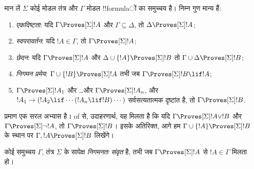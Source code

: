 \documentclass[../../../include/open-logic-section]{subfiles}
\begin{document}


\begin{prop}
  मान लें $\Sigma$ कोई मोडल तंत्र और $\Gamma$ मोडल !!{formula}ों का समुच्चय
  है। निम्न गुण मान्य हैं:
  \begin{enumerate}
  \item{} \emph{एकदिष्टता}: यदि
    $\Gamma \Proves[\Sigma] !A$ और $\Gamma \subseteq \Delta$, तो
    $\Delta \Proves[\Sigma] !A$;
  \item{}
    \emph{स्वपरावर्तन}: यदि $!A \in \Gamma$, तो $\Gamma
    \Proves[\Sigma] !A$;
  \item{} \emph{छेदन}: यदि $\Gamma
    \Proves[\Sigma] !A$ और $\Delta \cup \{!A\} \Proves[\Sigma] !B$
    तो $\Gamma \cup \Delta \Proves[\Sigma] !B$;
  \item{} \emph{निगमन प्रमेय}:
    $\Gamma \cup \{!B\} \Proves[\Sigma] !A$ तभी जब
    $\Gamma \Proves[\Sigma] !B \lif
      !A$;
  \item {}%
    $\Gamma \Proves[\Sigma] !A_1$ और \dots और
    $\Gamma \Proves[\Sigma] !A_n$, और
    $!A_1 \to (!A_2 \lif \cdots (!A_n \lif !B)\cdots)$ सर्वसत्यतात्मक
    दृष्टांत है, तो $\Gamma
    \Proves[\Sigma] !B$.
  \end{enumerate}
\end{prop}

प्रमाण एक सरल अभ्यास है।
 of 
से, उदाहरणार्थ, यह मिलता है कि यदि $\Gamma \Proves[\Sigma] !A \lor !B$
और $\Gamma \Proves[\Sigma] \lnot !A$, तो $\Gamma \Proves[\Sigma] !B$।
इसके अतिरिक्त, आगे हम $\Gamma \cup \{!A\} \Proves[\Sigma] !B$ के स्थान पर
$\Gamma, !A \Proves[\Sigma] !B$ लिखेंगे।

\begin{defn}
  कोई समुच्चय $\Gamma$, तंत्र $\Sigma$ के सापेक्ष \emph{निगमनतः संवृत} है,
  तभी जब $\Gamma \Proves[\Sigma] !A$ से $!A \in \Gamma$ मिलता हो।
\end{defn}
\end{document}
